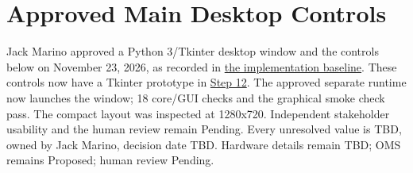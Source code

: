\section{Approved Main Desktop Controls}
\label{Section:ApprovedDesktopControls}
Jack Marino approved a Python 3/Tkinter desktop window and the controls below
on November 23, 2026, as recorded in
\hyperref[Section:ApprovedSoftwareChoices]{the implementation baseline}.
These controls now have a Tkinter prototype in \hyperref[Section:SimulatorPrototype]{Step 12}. The approved separate runtime now launches the window; 18 core/GUI checks and the graphical smoke check pass. The compact layout was inspected at 1280x720. Independent stakeholder usability and the human review remain Pending. Every unresolved value is TBD, owned by Jack Marino, decision date
TBD. Hardware details remain TBD; OMS remains Proposed; human review Pending.
